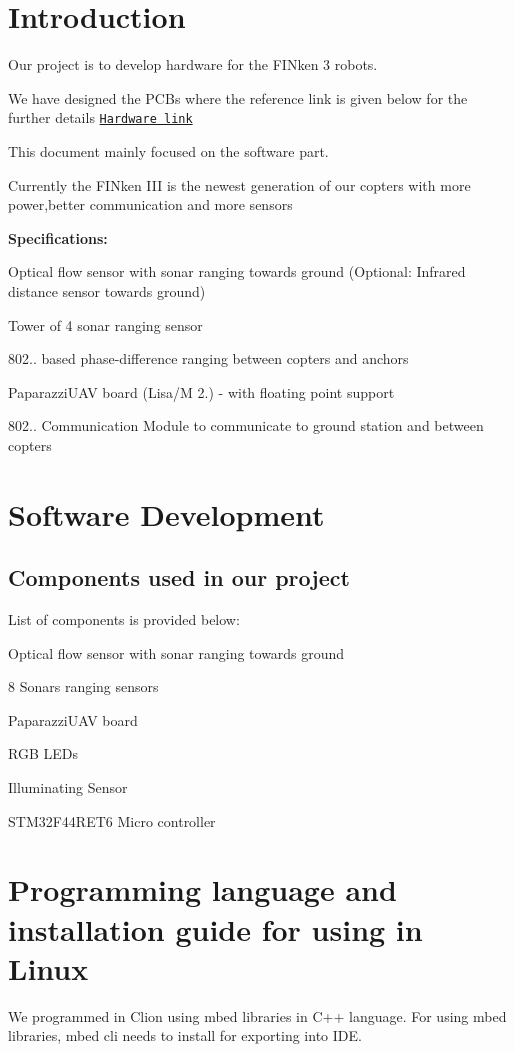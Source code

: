 \hypertarget{index_intro_sec}{}\section{Introduction}\label{index_intro_sec}
Our project is to develop hardware for the F\+I\+Nken 3 robots.

We have designed the P\+C\+Bs where the reference link is given below for the further details \href{https://github.com/ovgu-FINken/DE-HW-Hardware/wiki}{\tt Hardware link}

This document mainly focused on the software part.

Currently the F\+I\+Nken I\+II is the newest generation of our copters with more power,better communication and more sensors

{\bfseries Specifications\+:}


\begin{DoxyEnumerate}
\item Optical flow sensor with sonar ranging towards ground (Optional\+: Infrared distance sensor towards ground)
\item Tower of 4 sonar ranging sensor
\item 802.. based phase-\/difference ranging between copters and anchors
\item Paparazzi\+U\+AV board (Lisa/M 2.) -\/ with floating point support
\item 802.. Communication Module to communicate to ground station and between copters
\end{DoxyEnumerate}\hypertarget{index_Software_sec}{}\section{Software Development}\label{index_Software_sec}


\hypertarget{index_comp_sec}{}\subsection{Components used in our project}\label{index_comp_sec}




List of components is provided below\+:


\begin{DoxyEnumerate}
\item Optical flow sensor with sonar ranging towards ground
\item 8 Sonars ranging sensors
\item Paparazzi\+U\+AV board
\item R\+GB L\+E\+Ds
\item Illuminating Sensor
\item S\+T\+M32\+F44\+R\+E\+T6 Micro controller
\end{DoxyEnumerate}\hypertarget{index_about}{}\section{Programming language and installation guide for using in Linux}\label{index_about}
We programmed in Clion using mbed libraries in C++ language. For using mbed libraries, mbed cli needs to install for exporting into I\+DE.

